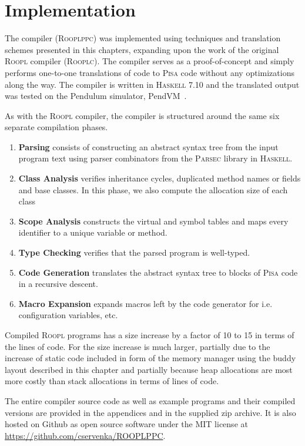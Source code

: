 \section{Implementation}
\label{sec:implementation}
The \rooplpp compiler (\textsc{Rooplppc}) was implemented using techniques and translation schemes presented in this chapters, expanding upon the work of the original \textsc{Roopl} compiler (\textsc{Rooplc}). The compiler serves as a proof-of-concept and simply performs one-to-one translations of \rooplpp code to \textsc{Pisa} code without any optimizations along the way. The compiler is written in \textsc{Haskell} 7.10 and the translated output was tested on the Pendulum simulator, PendVM~\cite{cr:pendvm}. 

As with the \textsc{Roopl} compiler, the \rooplpp compiler is structured around the same six separate compilation phases.
\begin{enumerate}
    \item \textbf{Parsing} consists of constructing an abstract syntax tree from the input program text using parser combinators from the \textsc{Parsec} library in \textsc{Haskell}.
    \item \textbf{Class Analysis} verifies inheritance cycles, duplicated method names or fields and base classes. In this phase, we also compute the allocation size of each class
    \item \textbf{Scope Analysis} constructs the virtual and symbol tables and maps every identifier to a unique variable or method.
    \item \textbf{Type Checking} verifies that the parsed program is well-typed.
    \item \textbf{Code Generation} translates the abstract syntax tree to blocks of \textsc{Pisa} code in a recursive descent.
    \item \textbf{Macro Expansion} expands macros left by the code generator for i.e. configuration variables, etc.
\end{enumerate}

Compiled \textsc{Roopl} programs has a size increase by a factor of 10 to 15 in terms of the lines of code. For \rooplpp the size increase is much larger, partially due to the increase of static code included in form of the memory manager using the buddy layout described in this chapter and partially because heap allocations are most more costly than stack allocations in terms of lines of code.

The entire compiler source code as well as example programs and their compiled versions are provided in the appendices and in the supplied zip archive. It is also hosted on Github as open source software under the MIT license at \url{https://github.com/cservenka/ROOPLPPC}.
